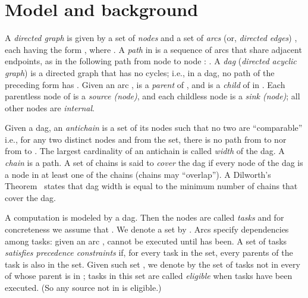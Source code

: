 \documentclass[letterpaper,11pt]{article}
\begin{document}
\section{Model and background}

\label{s.def}

A {\it directed graph}  is given by a set of {\it nodes} 
and a set of {\it arcs} (or, {\it directed edges}) , each
having the form , where .  A {\it
path} in  is a sequence of arcs that share adjacent endpoints, as
in the following path from node  to node : .  A {\it dag} ({\it directed
acyclic graph})  is a directed graph that has no cycles; i.e., in
a dag, no path of the preceding form has .
Given an arc ,  is a {\em parent} of
, and  is a {\em child} of  in .  Each parentless node of
 is a {\em source (node)}, and each childless node is a {\em sink
(node)}; all other nodes are {\em internal}.

Given a dag, an {\em antichain} is a set of its nodes such that no two are ``comparable'' i.e., for any two distinct nodes  and  from the set, there is no path from  to  nor from  to . The largest cardinality of an antichain is called {\em width} of the dag.
A {\em chain} is a path. A set of chains is said to {\em cover} the dag if every node of the dag is a node in at least one of the chains (chains may ``overlap''). A Dilworth's Theorem~\cite{Dil50} states that dag width is equal to the minimum number of chains that cover the dag.

A computation is modeled by a dag. Then the nodes are called {\em tasks} and for concreteness we assume that . We denote a set  by . Arcs specify dependencies among tasks: given an arc ,  cannot be executed until  has been. A set of tasks {\em satisfies precedence constraints} if, for every task in the set, every parents of the task is also in the set. Given such set , we denote by  the set of tasks not in  every of whose parent is in ; tasks in this set are called {\em eligible} when tasks  have been executed. (So any source not in  is eligible.)
\end{document}
